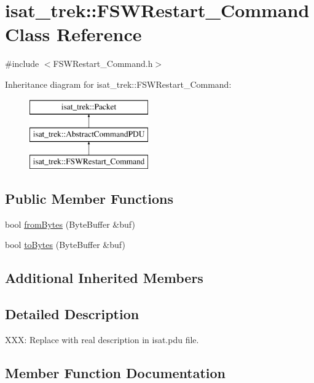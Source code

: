 \hypertarget{classisat__trek_1_1_f_s_w_restart___command}{}\section{isat\+\_\+trek\+:\+:F\+S\+W\+Restart\+\_\+\+Command Class Reference}
\label{classisat__trek_1_1_f_s_w_restart___command}


{\ttfamily \#include $<$F\+S\+W\+Restart\+\_\+\+Command.\+h$>$}

Inheritance diagram for isat\+\_\+trek\+:\+:F\+S\+W\+Restart\+\_\+\+Command\+:\begin{figure}[H]
\begin{center}
\leavevmode
\includegraphics[height=3.000000cm]{classisat__trek_1_1_f_s_w_restart___command}
\end{center}
\end{figure}
\subsection*{Public Member Functions}
\begin{DoxyCompactItemize}
\item 
bool \hyperlink{classisat__trek_1_1_f_s_w_restart___command_a743dc34ed5eff41c806566e1d9a9892f}{from\+Bytes} (Byte\+Buffer \&buf)
\item 
bool \hyperlink{classisat__trek_1_1_f_s_w_restart___command_a40498621916cbf4e90f3ed16cb23338e}{to\+Bytes} (Byte\+Buffer \&buf)
\end{DoxyCompactItemize}
\subsection*{Additional Inherited Members}


\subsection{Detailed Description}
X\+XX\+: Replace with real description in isat.\+pdu file. 

\subsection{Member Function Documentation}
